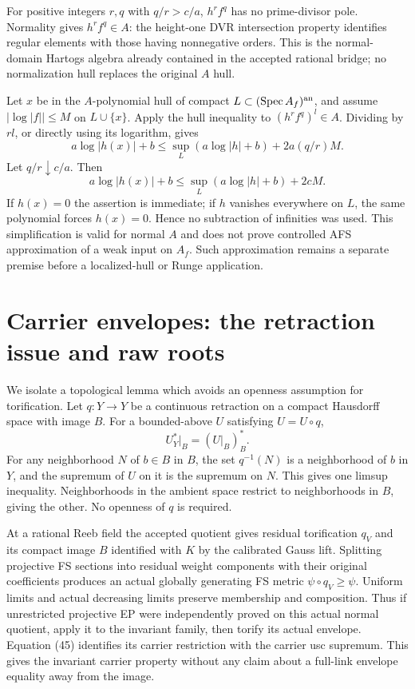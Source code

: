 \documentclass[
  10pt,
]{article}
\begin{document}
For positive integers \(r,q\) with \(q/r>c/a\), \(h^rf^q\) has no
prime-divisor pole. Normality gives \(h^rf^q\in A\): the height-one DVR
intersection property identifies regular elements with those having
nonnegative orders. This is the normal-domain Hartogs algebra already
contained in the accepted rational bridge; no normalization hull
replaces the original \(A\) hull.

Let \(x\) be in the \(A\)-polynomial hull of compact
\(L\subset (\operatorname{Spec}A_f)^{\rm an}\), and assume
\(|\log|f||\le M\) on \(L\cup\{x\}\). Apply the hull inequality to
\((h^rf^q)^l\in A\). Dividing by \(rl\), or directly using its
logarithm, gives \[a\log|h(x)|+b\le\sup_L(a\log|h|+b)+2a(q/r)M.\] Let
\(q/r\downarrow c/a\). Then
\[a\log|h(x)|+b\le\sup_L(a\log|h|+b)+2cM. \tag{44}\] If \(h(x)=0\) the
assertion is immediate; if \(h\) vanishes everywhere on \(L\), the same
polynomial forces \(h(x)=0\). Hence no subtraction of infinities was
used. This simplification is valid for normal \(A\) and does not prove
controlled AFS approximation of a weak input on \(A_f\). Such
approximation remains a separate premise before a localized-hull or
Runge application.

\section{Carrier envelopes: the retraction issue and raw
roots}\label{carrier-envelopes-the-retraction-issue-and-raw-roots}

We isolate a topological lemma which avoids an openness assumption for
torification. Let \(q:Y\to Y\) be a continuous retraction on a compact
Hausdorff space with image \(B\). For a bounded-above \(U\) satisfying
\(U=U\circ q\), \[U_Y^*|_B=(U|_B)_B^*. \tag{45}\] For any neighborhood
\(N\) of \(b\in B\) in \(B\), the set \(q^{-1}(N)\) is a neighborhood of
\(b\) in \(Y\), and the supremum of \(U\) on it is the supremum on
\(N\). This gives one limsup inequality. Neighborhoods in the ambient
space restrict to neighborhoods in \(B\), giving the other. No openness
of \(q\) is required.

At a rational Reeb field the accepted quotient gives residual
torification \(q_V\) and its compact image \(B\) identified with \(K\)
by the calibrated Gauss lift. Splitting projective FS sections into
residual weight components with their original coefficients produces an
actual globally generating FS metric \(\psi\circ q_V\ge\psi\). Uniform
limits and actual decreasing limits preserve membership and composition.
Thus if unrestricted projective EP were independently proved on this
actual normal quotient, apply it to the invariant family, then torify
its actual envelope. Equation (45) identifies its carrier restriction
with the carrier usc supremum. This gives the invariant carrier property
without any claim about a full-link envelope equality away from the
image.
\end{document}
